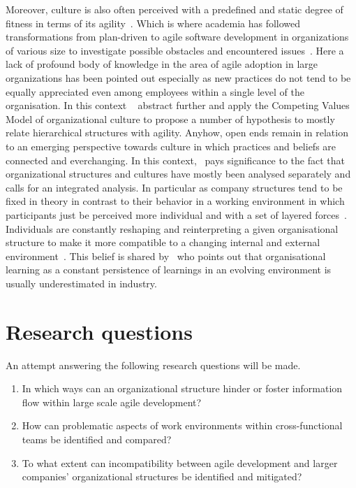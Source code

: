 \documentclass[paper=a4, fontsize=11pt]{scrartcl}
\numberwithin{equation}{section}		%
\numberwithin{figure}{section}			%
\numberwithin{table}{section}			%
\begin{document}
Moreover, culture is also often perceived with a predefined and static degree of fitness in terms of its agility~\citep{ivari2011orgagile}. Which is where academia has followed transformations from plan-driven to agile software development in organizations of various size to investigate possible obstacles and encountered issues~\citep{laanti2011nokia}. Here a lack of profound body of knowledge in the area of agile adoption in large organizations has been pointed out especially as new practices do not tend to be equally appreciated even among employees within a single level of the organisation. In this context ~\citet{ivari2011orgagile} abstract further and apply the Competing Values Model of organizational culture to propose a number of hypothesis to mostly relate hierarchical structures with agility. Anyhow, open ends remain in relation to an emerging perspective towards culture in which practices and beliefs are connected and everchanging. In this context,~\citet{gallivan2005persculture} pays significance to the fact that organizational structures and cultures have mostly been analysed separately and calls for an integrated analysis. In particular as company structures tend to be fixed in theory in contrast to their behavior in a working environment in which participants just be perceived more individual and with a set of layered forces~\citep{gallivan2005persculture}. Individuals are constantly reshaping and reinterpreting a given organisational structure to make it more compatible to a changing internal and external environment~\citep{iivari2010usability}. This belief is shared by~\citet{robey2000learning} who points out that organisational learning as a constant persistence of learnings in an evolving environment is usually underestimated in industry.

\section{Research questions}

An attempt answering the following research questions will be made.

\begin{enumerate}
   \item In which ways can an organizational structure hinder or foster information flow within large scale agile development?
   \item How can problematic aspects of work environments within cross-functional teams be identified and compared?
   \item To what extent can incompatibility between agile development and larger companies' organizational structures be identified and mitigated?
\end{enumerate}
\end{document}
